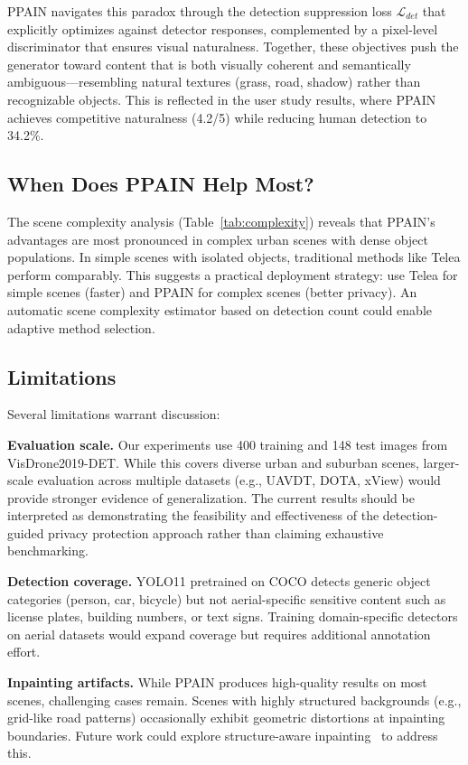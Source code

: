 \documentclass[preprint,12pt]{elsarticle}
\begin{document}
PPAIN navigates this paradox through the detection suppression loss $\mathcal{L}_{det}$ that explicitly optimizes against detector responses, complemented by a pixel-level discriminator that ensures visual naturalness. Together, these objectives push the generator toward content that is both visually coherent and semantically ambiguous---resembling natural textures (grass, road, shadow) rather than recognizable objects. This is reflected in the user study results, where PPAIN achieves competitive naturalness (4.2/5) while reducing human detection to 34.2\%.

\subsection{When Does PPAIN Help Most?}

The scene complexity analysis (Table~\ref{tab:complexity}) reveals that PPAIN's advantages are most pronounced in complex urban scenes with dense object populations. In simple scenes with isolated objects, traditional methods like Telea perform comparably. This suggests a practical deployment strategy: use Telea for simple scenes (faster) and PPAIN for complex scenes (better privacy). An automatic scene complexity estimator based on detection count could enable adaptive method selection.

\subsection{Limitations}

Several limitations warrant discussion:

\textbf{Evaluation scale.} Our experiments use 400 training and 148 test images from VisDrone2019-DET. While this covers diverse urban and suburban scenes, larger-scale evaluation across multiple datasets (e.g., UAVDT, DOTA, xView) would provide stronger evidence of generalization. The current results should be interpreted as demonstrating the feasibility and effectiveness of the detection-guided privacy protection approach rather than claiming exhaustive benchmarking.

\textbf{Detection coverage.} YOLO11 pretrained on COCO detects generic object categories (person, car, bicycle) but not aerial-specific sensitive content such as license plates, building numbers, or text signs. Training domain-specific detectors on aerial datasets would expand coverage but requires additional annotation effort.

\textbf{Inpainting artifacts.} While PPAIN produces high-quality results on most scenes, challenging cases remain. Scenes with highly structured backgrounds (e.g., grid-like road patterns) occasionally exhibit geometric distortions at inpainting boundaries. Future work could explore structure-aware inpainting~\cite{wan2021high} to address this.
\end{document}
